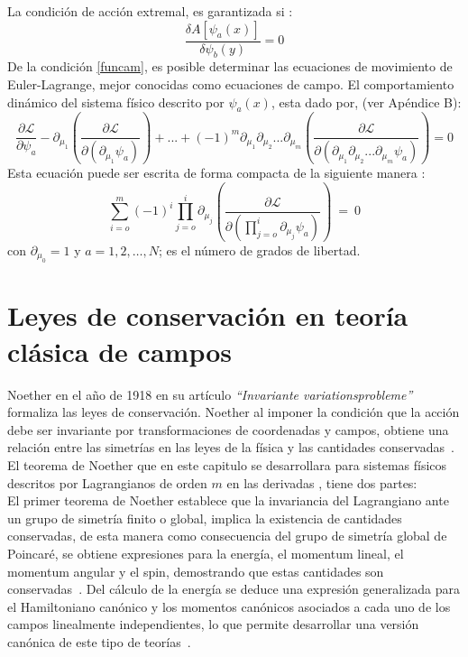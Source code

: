 \documentclass[a4paper,12pt]{article}
\begin{document}
La condición de acción extremal, es garantizada si \cite{noether}:
\begin{equation}
\frac{\delta A[\psi_a(x)]}{\delta \psi_b(y)}=0 
\label{funcam}
\end{equation}
De la condición \eqref{funcam}, es posible determinar las ecuaciones de movimiento de \mbox{Euler-Lagrange}, mejor conocidas como ecuaciones de campo. El comportamiento dinámico del sistema físico descrito por $\psi_a(x)$, esta dado por, (ver Apéndice B):
\begin{equation}
\frac{\partial\mathscr{L} }{\partial \psi_a}-\partial_{\mu_1}\left(\frac{\partial \mathscr{L}}{\partial(\partial _{\mu_1}\psi_a)}\right)+...+(-1)^m\partial_{\mu_1}\partial_{\mu_2}...\partial_{\mu_m}\left(\frac{\partial \mathscr{L}}{\partial (\partial_{\mu_1}\partial_{\mu_2}...\partial_{\mu_m}\psi_a)}\right)=0 
\label{euge}
\end{equation}
Esta ecuación puede ser escrita de forma compacta de la siguiente manera \cite{general}:
\begin{equation}
\sum\limits_{i=o}^m(-1)^i\prod\limits_{j=o}^i\partial_{\mu_j}\left(\frac{\partial\mathscr{L} }{\partial(\prod\limits_{j=o}^i\partial_{\mu_j}\psi_a)} \right)\ =\ 0 
\end{equation}
con \mbox{$\partial_{\mu_0}=1$} y \mbox{$a=1,2,\dotso,N$}; es el número de grados de libertad.
\newpage 
\section{Leyes de conservación en teoría clásica de campos}
Noether en el año de 1918 en su artículo  \textit{``Invariante variationsprobleme''} formaliza las leyes de conservación. Noether al imponer la condición que la acción debe ser invariante por transformaciones de coordenadas y campos, obtiene una relación entre las simetrías en las leyes de la física y las cantidades \mbox{conservadas \cite{ noether, greiner, emmy}}. El teorema de Noether que en este capitulo se desarrollara para sistemas físicos descritos por Lagrangianos de orden $m$ en las derivadas \cite{general}, tiene dos partes:
\\

El primer teorema de Noether establece que la invariancia del Lagrangiano ante un grupo de simetría finito o global, implica la existencia de cantidades \mbox{conservadas}, de esta manera como consecuencia del grupo de simetría global de Poincaré, se obtiene expresiones para la energía, el momentum lineal, el momentum \mbox{angular} y el spin, demostrando que estas cantidades son \mbox{conservadas \cite{ noether, greiner, emmy}}. Del cálculo de la energía se deduce una expresión \mbox{generalizada} para el Hamiltoniano canónico y los momentos canónicos asociados a cada uno de los campos linealmente \mbox{independientes}, lo que permite desarrollar una versión canónica de este tipo de \mbox{teorías \cite{general}.}
\\
\end{document}
